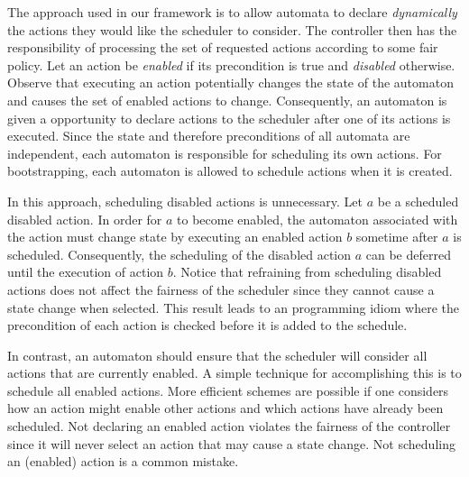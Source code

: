 The approach used in our framework is to allow automata to declare \emph{dynamically} the actions they would like the scheduler to consider.
The controller then has the responsibility of processing the set of requested actions according to some fair policy.
Let an action be \emph{enabled} if its precondition is true and \emph{disabled} otherwise.
Observe that executing an action potentially changes the state of the automaton and causes the set of enabled actions to change.
Consequently, an automaton is given a opportunity to declare actions to the scheduler after one of its actions is executed.
Since the state and therefore preconditions of all automata are independent, each automaton is responsible for scheduling its own actions.
For bootstrapping, each automaton is allowed to schedule actions when it is created.

In this approach, scheduling disabled actions is unnecessary.
Let $a$ be a scheduled disabled action.
In order for $a$ to become enabled, the automaton associated with the action must change state by executing an enabled action $b$ sometime after $a$ is scheduled.
Consequently, the scheduling of the disabled action $a$ can be deferred until the execution of action $b$.
Notice that refraining from scheduling disabled actions does not affect the fairness of the scheduler since they cannot cause a state change when selected.
This result leads to an programming idiom where the precondition of each action is checked before it is added to the schedule.

In contrast, an automaton should ensure that the scheduler will consider all actions that are currently enabled.
A simple technique for accomplishing this is to schedule all enabled actions.
More efficient schemes are possible if one considers how an action might enable other actions and which actions have already been scheduled.
Not declaring an enabled action violates the fairness of the controller since it will never select an action that may cause a state change.
Not scheduling an (enabled) action is a common mistake.


